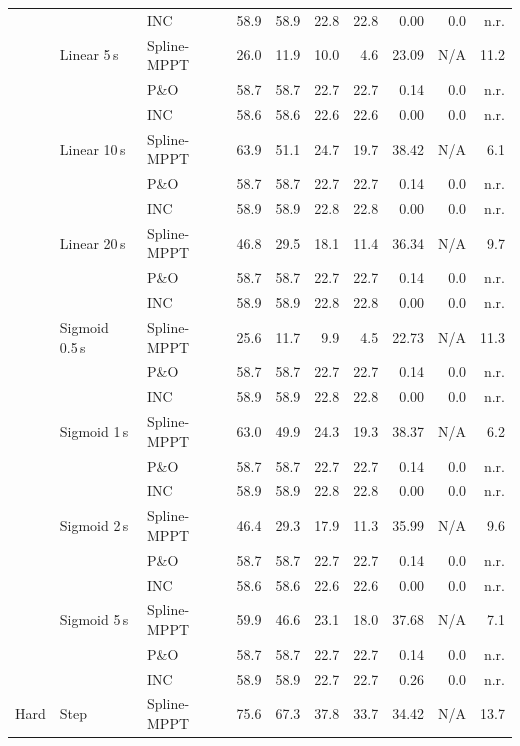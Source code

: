 \begin{longtable}{@{}lll rr rr r rr@{}}
 &  & INC & 58.9 & 58.9 & 22.8 & 22.8 & 0.00 & 0.0 & n.r. \\
\addlinespace[2pt]
 & Linear 5\,s & Spline-MPPT & 26.0 & 11.9 & 10.0 & 4.6 & 23.09 & N/A & 11.2 \\
 &  & P\&O & 58.7 & 58.7 & 22.7 & 22.7 & 0.14 & 0.0 & n.r. \\
 &  & INC & 58.6 & 58.6 & 22.6 & 22.6 & 0.00 & 0.0 & n.r. \\
\addlinespace[2pt]
 & Linear 10\,s & Spline-MPPT & 63.9 & 51.1 & 24.7 & 19.7 & 38.42 & N/A & 6.1 \\
 &  & P\&O & 58.7 & 58.7 & 22.7 & 22.7 & 0.14 & 0.0 & n.r. \\
 &  & INC & 58.9 & 58.9 & 22.8 & 22.8 & 0.00 & 0.0 & n.r. \\
\addlinespace[2pt]
 & Linear 20\,s & Spline-MPPT & 46.8 & 29.5 & 18.1 & 11.4 & 36.34 & N/A & 9.7 \\
 &  & P\&O & 58.7 & 58.7 & 22.7 & 22.7 & 0.14 & 0.0 & n.r. \\
 &  & INC & 58.9 & 58.9 & 22.8 & 22.8 & 0.00 & 0.0 & n.r. \\
\addlinespace[2pt]
 & Sigmoid 0.5\,s & Spline-MPPT & 25.6 & 11.7 & 9.9 & 4.5 & 22.73 & N/A & 11.3 \\
 &  & P\&O & 58.7 & 58.7 & 22.7 & 22.7 & 0.14 & 0.0 & n.r. \\
 &  & INC & 58.9 & 58.9 & 22.8 & 22.8 & 0.00 & 0.0 & n.r. \\
\addlinespace[2pt]
 & Sigmoid 1\,s & Spline-MPPT & 63.0 & 49.9 & 24.3 & 19.3 & 38.37 & N/A & 6.2 \\
 &  & P\&O & 58.7 & 58.7 & 22.7 & 22.7 & 0.14 & 0.0 & n.r. \\
 &  & INC & 58.9 & 58.9 & 22.8 & 22.8 & 0.00 & 0.0 & n.r. \\
\addlinespace[2pt]
 & Sigmoid 2\,s & Spline-MPPT & 46.4 & 29.3 & 17.9 & 11.3 & 35.99 & N/A & 9.6 \\
 &  & P\&O & 58.7 & 58.7 & 22.7 & 22.7 & 0.14 & 0.0 & n.r. \\
 &  & INC & 58.6 & 58.6 & 22.6 & 22.6 & 0.00 & 0.0 & n.r. \\
\addlinespace[2pt]
 & Sigmoid 5\,s & Spline-MPPT & 59.9 & 46.6 & 23.1 & 18.0 & 37.68 & N/A & 7.1 \\
 &  & P\&O & 58.7 & 58.7 & 22.7 & 22.7 & 0.14 & 0.0 & n.r. \\
 &  & INC & 58.9 & 58.9 & 22.7 & 22.7 & 0.26 & 0.0 & n.r. \\
\addlinespace[2pt]
Hard & Step & Spline-MPPT & 75.6 & 67.3 & 37.8 & 33.7 & 34.42 & N/A & 13.7 \\

\end{longtable}
